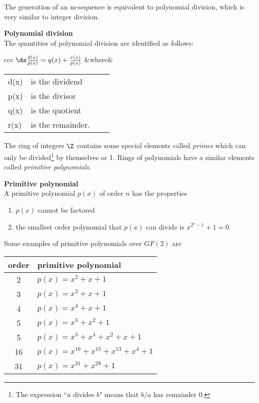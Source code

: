The generation of an m-sequence is equivalent to polynomial division,
which is very similar to integer division.

\begin{definition} {\bf Polynomial division} \\
The quantities of polynomial division are identified as follows:

\begin{center}
\begin{tabular}{ccc}
$\ds \frac{d(x)}{p(x)} = q(x) + \frac{r(x)}{p(x)}$
&where&
\begin{tabular}{llll}
   d(x) & is the dividend \\
   p(x) & is the divisor  \\
   q(x) & is the quotient \\
   r(x) & is the remainder.
\end{tabular}
\end{tabular}
\end{center}
\end{definition}

The ring of integers $\Z$ contains some special elements called {\em primes}
which can only be divided\footnote{
   The expression ``$a$ divides $b$" means that $b/a$ has remainder 0.
}
 by themselves or 1.
Rings of polynomials have a similar elements called {\em primitive polynomials}.

\begin{definition} {\bf Primitive polynomial} \\
A primitive polynomial $p(x)$ of order $n$ has the properties
\begin{enumerate}
\setlength{\itemsep}{0ex}
   \item $p(x)$ cannot be factored
   \item the smallest order polynomial that $p(x)$ can divide is $x^{2^n-1}+1=0$.
\end{enumerate}
\end{definition}

Some examples of primitive polynomials over $GF(2)$ are

\begin{center}
\begin{tabular}{cl}
   order & primitive polynomial \\
   \hline
    2 & $p(x) = x^2 + x + 1 $ \\
    3 & $p(x) = x^3 + x + 1 $ \\
    4 & $p(x) = x^4 + x + 1 $ \\
    5 & $p(x) = x^5 + x^2 + 1 $ \\
    5 & $p(x) = x^5 + x^4 + x^2 + x + 1 $ \\
   16 & $p(x) = x^{16} + x^{15} + x^{13} + x^4 + 1 $\\
   31 & $p(x) = x^{31} + x^{28} + 1 $
\end{tabular}
\end{center}

